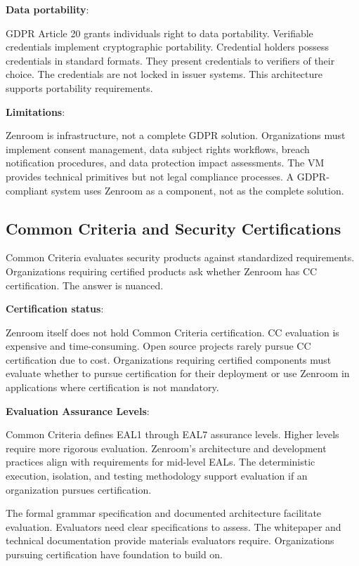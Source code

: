 \textbf{Data portability}:

GDPR Article 20 grants individuals right to data
portability. Verifiable credentials implement cryptographic
portability. Credential holders possess credentials in standard
formats. They present credentials to verifiers of their choice. The
credentials are not locked in issuer systems. This architecture
supports portability requirements.

\textbf{Limitations}:

Zenroom is infrastructure, not a complete GDPR solution. Organizations
must implement consent management, data subject rights workflows,
breach notification procedures, and data protection impact
assessments. The VM provides technical primitives but not legal
compliance processes. A GDPR-compliant system uses Zenroom as a
component, not as the complete solution.

\subsection{Common Criteria and Security Certifications}

Common Criteria evaluates security products against standardized
requirements. Organizations requiring certified products ask whether
Zenroom has CC certification. The answer is nuanced.

\textbf{Certification status}:

Zenroom itself does not hold Common Criteria certification. CC
evaluation is expensive and time-consuming. Open source projects
rarely pursue CC certification due to cost. Organizations requiring
certified components must evaluate whether to pursue certification for
their deployment or use Zenroom in applications where certification is
not mandatory.

\textbf{Evaluation Assurance Levels}:

Common Criteria defines EAL1 through EAL7 assurance levels. Higher
levels require more rigorous evaluation. Zenroom's architecture and
development practices align with requirements for mid-level EALs. The
deterministic execution, isolation, and testing methodology support
evaluation if an organization pursues certification.

The formal grammar specification and documented architecture
facilitate evaluation. Evaluators need clear specifications to
assess. The whitepaper and technical documentation provide materials
evaluators require. Organizations pursuing certification have
foundation to build on.

